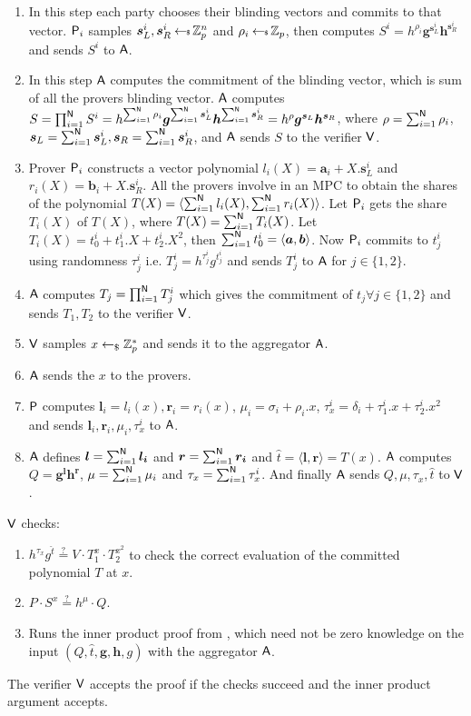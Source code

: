 \begin{enumerate}
	\item In this step each party chooses their blinding vectors and commits to that vector. $\mathsf{P}_i$ samples $\bm{s}^i_L, \bm{s}^i_R \hskip2.3pt{\gets\!\!\mbox{\tiny${\$}$\normalsize}}\, \mathbb{Z}_p^n$ and $\rho_i\hskip2.3pt{\gets\!\!\mbox{\tiny${\$}$\normalsize}}\, \mathbb{Z}_p$, then computes $S^i=h^{\rho_i}\bm{g}^{\bm{s}^i_L}\bm{h}^{\bm{s}^i_R}$ and sends $S^i$ to $\mathsf{A}$.
	\item In this step $\mathsf{A}$ computes the commitment of the blinding vector, which is sum of all the provers blinding vector. $\mathsf{A}$ computes $S = \prod_{i=1}^{\mathsf{N}}S^i = h^{\sum_{i=1}^{\mathsf{N}}\rho_i}\bm{g}^{\sum_{i=1}^{\mathsf{N}}\bm{s}_L^i}\bm{h}^{\sum_{i=1}^{\mathsf{N}}\bm{s}^i_R} = h^{\rho}\bm{g}^{\bm{s}_L}\bm{h}^{\bm{s}_R}$, where $\rho = \sum_{i=1}^{\mathsf{N}}\rho_i$, $\bm{s}_L =\sum_{i=1}^{\mathsf{N}} \bm{s}^i_L,  \bm{s}_R=\sum_{i=1}^{\mathsf{N}}\bm{s}^i_R$, and $\mathsf{A}$ sends $S$ to the verifier $\mathsf{V}$.
	\item Prover $\mathsf{P}_i$ constructs a vector polynomial $l_i(X)=\bm{a}_i + X. \bm{s}^i_L$ and $r_i(X)=\bm{b}_i + X. \bm{s}^i_R$. All the provers involve in an MPC to obtain the shares of the polynomial $T(X)=\langle \sum_{i=1}^{\mathsf{N}} l_i(X),\sum_{i=1}^{\mathsf{N}} r_i(X)\rangle$. Let $\mathsf{P}_i$ gets the share $T_i(X)$ of $T(X)$, where $T(X)=\sum_{i=1}^{\mathsf{N}}T_i(X)$. Let $T_i(X)= t^i_0+t^i_1.X+t^i_2.X^2$, then $\sum_{i=1}^{\mathsf{N}} t^i_0=\langle \bm{a}, \bm{b} \rangle$. Now $\mathsf{P}_i$ commits to $t^i_j$ using randomness $\tau^i_j$ i.e. $T^i_j=h^{\tau^i_j}g^{t^i_j}$ and sends $T^i_j$ to $\mathsf{A}$ for $j\in \{1,2\}$.
	\item $\mathsf{A}$ computes $T_j=\prod_{i=1}^{\mathsf{N}} T^i_j$ which gives the commitment of $t_j \forall j\in\{1,2\}$ and sends $T_1,T_2$ to the verifier $\mathsf{V}$.
	\item $\mathsf{V}$ samples $x\leftarrow_\$\mathbb{Z}^*_p$ and sends it to the aggregator $\mathsf{A}$.
	\item $\mathsf{A}$ sends the $x$ to the provers. 
	\item $\mathsf{P}$ computes $\bm{l}_i=l_i(x), \bm{r}_i=r_i(x)$, $\mu_i= \sigma_i+\rho_i.x$, $\tau^i_x= \delta_i+\tau^i_1.x+\tau^i_2.x^2$ and sends $\bm{l}_i,\bm{r}_i, \mu_i, \tau^i_x$ to $\mathsf{A}$.
	\item $\mathsf{A}$ defines $\bm{l}=\sum_{i=1}^{\mathsf{N}}\bm{l_i}$ and $\bm{r}=\sum_{i=1}^{\mathsf{N}}\bm{r_i}$ and $\hat{t}=\langle \bm{l},\bm{r}\rangle =T(x)$. $\mathsf{A}$ computes $Q=\bm{g^lh^r}$, $\mu=\sum_{i=1}^{\mathsf{N}} \mu_i$ and $\tau_x = \sum_{i=1}^{\mathsf{N}}\tau_x^i$. And finally $\mathsf{A}$ sends $Q, \mu, \tau_x, \hat{t}$ to $\mathsf{V}$.
\end{enumerate}
$\mathsf{V}$ checks: 
\begin{enumerate}
	\item $h^{\tau_x}g^{\hat{t}} \stackrel{?}{=} V\cdot T_1^x\cdot T_2^{x^2}$ to check the correct evaluation of the committed polynomial $T$ at $x$.
	\item $P\cdot S^x \stackrel{?}{=} h^{\mu}\cdot Q$. 
	\item Runs the inner product proof from \cite{bulletproofs}, which need not be zero knowledge on the input $(Q, \hat{t}, \bm{g}, \bm{h}, g)$ with the aggregator $\mathsf{A}$.
\end{enumerate}
The verifier $\mathsf{V}$ accepts the proof if the checks succeed and the inner product argument accepts.

